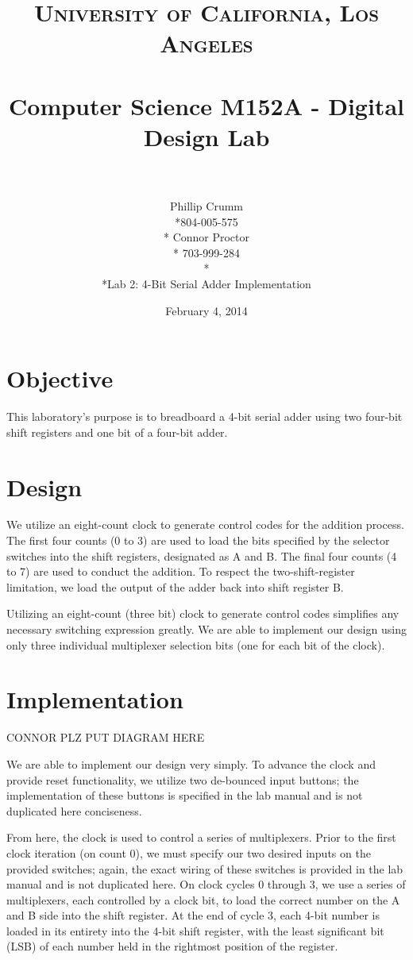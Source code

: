 \documentclass[paper=letter, fontsize=11pt]{scrartcl}
\title{	
\normalfont \normalsize 
\textsc{University of California, Los Angeles} \\ [25pt]
\horrule{0.5pt} \\[0.4cm]
\Large Computer Science M152A - Digital Design Lab \\
\horrule{2pt} \\[0.5cm]
}
\author{Phillip Crumm \\*804-005-575 \\* Connor Proctor \\* 703-999-284 \\* \\*Lab 2: 4-Bit Serial Adder Implementation}
\date{\normalsize February 4, 2014}
\begin{document}
\clearpage\maketitle
\thispagestyle{empty}
\pagebreak


\section{Objective}
This laboratory's purpose is to breadboard a 4-bit serial adder using two four-bit shift registers and one bit of a four-bit adder. 

\section{Design}
We utilize an eight-count clock to generate control codes for the addition process. The first four counts (0 to 3) are used to load the bits specified by the selector switches into the shift registers, designated as A and B. The final four counts (4 to 7) are used to conduct the addition. To respect the two-shift-register limitation, we load the output of the adder back into shift register B.

Utilizing an eight-count (three bit) clock to generate control codes simplifies any necessary switching expression greatly. We are able to implement our design using only three individual multiplexer selection bits (one for each bit of the clock).

\section{Implementation}

CONNOR PLZ PUT DIAGRAM HERE

We are able to implement our design very simply. To advance the clock and provide reset functionality, we utilize two de-bounced input buttons; the implementation of these buttons is specified in the lab manual and is not duplicated here conciseness.

From here, the clock is used to control a series of multiplexers. Prior to the first clock iteration (on count 0), we must specify our two desired inputs on the provided switches; again, the exact wiring of these switches is provided in the lab manual and is not duplicated here. On clock cycles 0 through 3, we use a series of multiplexers, each controlled by a clock bit, to load the correct number on the A and B side into the shift register. At the end of cycle 3, each 4-bit number is loaded in its entirety into the 4-bit shift register, with the least significant bit (LSB) of each number held in the rightmost position of the register.
\end{document}
